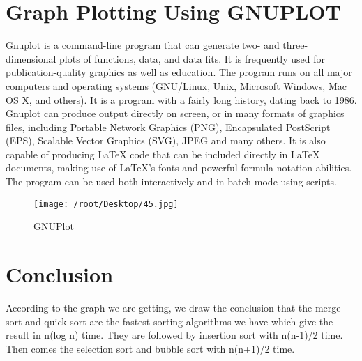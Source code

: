 \documentclass[22pt]{IEEEtran}
\begin{document}
\section{Graph Plotting Using GNUPLOT}
\label{sec:Grapgh}
\begin{itemize}
Gnuplot is a command-line program that can generate two- and three-dimensional plots of functions, data, and data fits. It is frequently used for publication-quality graphics as well as education. The program runs on all major computers and operating systems (GNU/Linux, Unix, Microsoft Windows, Mac OS X, and others). It is a program with a fairly long history, dating back to 1986.
Gnuplot can produce output directly on screen, or in many formats of graphics files, including Portable Network Graphics (PNG), Encapsulated PostScript (EPS), Scalable Vector Graphics (SVG), JPEG and many others. It is also capable of producing LaTeX code that can be included directly in LaTeX documents, making use of LaTeX's fonts and powerful formula notation abilities. The program can be used both interactively and in batch mode using scripts.
\end{itemize}
\begin{figure}[h!]
\texttt{[image: /root/Desktop/45.jpg]}
\caption{GNUPlot}
\centered
\end{figure}

\section{Conclusion}
According to the graph we are getting, we draw the conclusion that the merge sort and quick sort are the fastest sorting algorithms we have which give the result in n(log n) time. 
They are followed by insertion sort with n(n-1)/2 time.
Then comes the selection sort and bubble sort with n(n+1)/2 time.
\end{document}
